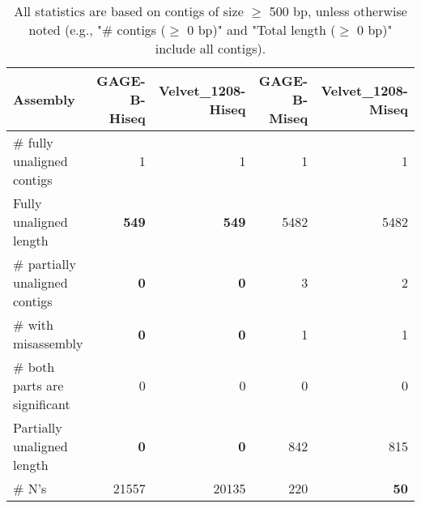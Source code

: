\documentclass[12pt,a4paper]{article}
\begin{document}
\begin{table}[ht]
\begin{center}
\caption{All statistics are based on contigs of size $\geq$ 500 bp, unless otherwise noted (e.g., "\# contigs ($\geq$ 0 bp)" and "Total length ($\geq$ 0 bp)" include all contigs).}
\begin{tabular}{|l*{4}{|r}|}
\hline
Assembly & GAGE-B-Hiseq & Velvet\_1208-Hiseq & GAGE-B-Miseq & Velvet\_1208-Miseq \\ \hline
\# fully unaligned contigs & 1 & 1 & 1 & 1 \\ \hline
Fully unaligned length & {\bf 549} & {\bf 549} & 5482 & 5482 \\ \hline
\# partially unaligned contigs & {\bf 0} & {\bf 0} & 3 & 2 \\ \hline
\hspace{5mm}\# with misassembly & {\bf 0} & {\bf 0} & 1 & 1 \\ \hline
\hspace{5mm}\# both parts are significant & 0 & 0 & 0 & 0 \\ \hline
Partially unaligned length & {\bf 0} & {\bf 0} & 842 & 815 \\ \hline
\# N's & 21557 & 20135 & 220 & {\bf 50} \\ \hline
\end{tabular}
\end{center}
\end{table}
\end{document}
